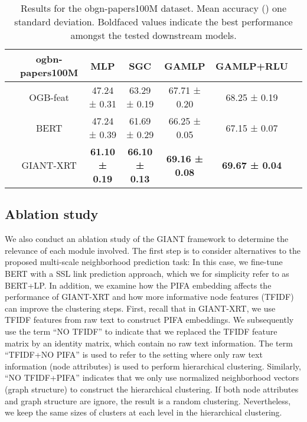 \documentclass{article} \usepackage{iclr2022_conference,times}
\begin{document}
\begin{table}[t]
\setlength{\tabcolsep}{2.75pt}
\caption{Results for the obgn-papers100M dataset. Mean accuracy ()  one standard deviation. Boldfaced values indicate the best performance amongst the tested downstream models.}
\vspace{0.1cm}
\label{tab:ogbn-papers100M}
\centering
\small
\begin{tabular}{@{}ccccccc@{}}
    \toprule
    & ogbn-papers100M & MLP & SGC & GAMLP & GAMLP+RLU \\
    \midrule
    \multicolumn{1}{c}{\multirow{2}{*}{}} & OGB-feat
        & 47.24 ± 0.31 & 63.29 ± 0.19 & 67.71 ± 0.20 & 68.25 ± 0.19 \\
    \multicolumn{1}{c}{} & BERT
        & 47.24 ± 0.39 & 61.69 ± 0.29 & 66.25 ± 0.05 & 67.15 ± 0.07 \\
    \midrule
     & GIANT-XRT
        & \textbf{61.10 ± 0.19} & \textbf{66.10 ± 0.13} & \textbf{69.16 ± 0.08} & \textbf{69.67 ± 0.04} \\
    \bottomrule
\end{tabular}
\vspace{-0.2cm}
\end{table}

\subsection{Ablation study}
We also conduct an ablation study of the GIANT framework to determine the relevance of each module involved. The first step is to consider alternatives to the proposed multi-scale neighborhood prediction task: In this case, we fine-tune BERT with a SSL link prediction approach, which we for simplicity refer to as BERT+LP.
In addition, we examine how the PIFA embedding affects the performance of GIANT-XRT and how more informative node features (TFIDF) can improve the clustering steps. First, recall that in GIANT-XRT, we use TFIDF features from raw text to construct PIFA embeddings. We subsequently use the term ``NO TFIDF'' to indicate that we replaced the TFIDF feature matrix by an identity matrix, which contain no raw text information. The term ``TFIDF+NO PIFA'' is used to refer to the setting where only raw text information (node attributes) is used to perform hierarchical clustering. Similarly, ``NO TFIDF+PIFA'' indicates that we  only use normalized neighborhood vectors (graph structure) to construct the hierarchical clustering. If both node attributes and graph structure are ignore, the result is a random clustering. Nevertheless, we keep the same sizes of clusters at each level in the hierarchical clustering.
\end{document}

